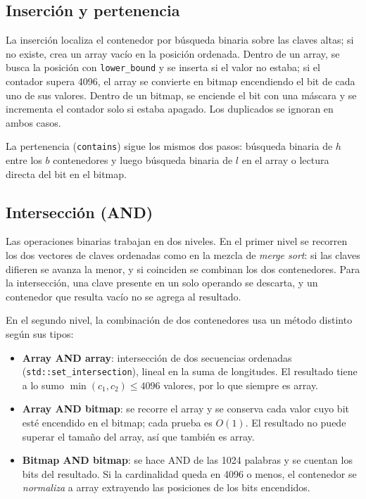 \documentclass[11pt,a4paper]{article}
\begin{document}
\subsection{Inserción y pertenencia}
La inserción localiza el contenedor por búsqueda binaria sobre las claves altas; si no existe, crea un array vacío en la posición ordenada. Dentro de un array, se busca la posición con \texttt{lower\_bound} y se inserta si el valor no estaba; si el contador supera 4096, el array se convierte en bitmap encendiendo el bit de cada uno de sus valores. Dentro de un bitmap, se enciende el bit con una máscara y se incrementa el contador solo si estaba apagado. Los duplicados se ignoran en ambos casos.

La pertenencia (\texttt{contains}) sigue los mismos dos pasos: búsqueda binaria de $h$ entre los $b$ contenedores y luego búsqueda binaria de $l$ en el array o lectura directa del bit en el bitmap.

\subsection{Intersección (AND)}
Las operaciones binarias trabajan en dos niveles. En el primer nivel se recorren los dos vectores de claves ordenadas como en la mezcla de \emph{merge sort}: si las claves difieren se avanza la menor, y si coinciden se combinan los dos contenedores. Para la intersección, una clave presente en un solo operando se descarta, y un contenedor que resulta vacío no se agrega al resultado.

En el segundo nivel, la combinación de dos contenedores usa un método distinto según sus tipos:
\begin{itemize}
\item \textbf{Array AND array}: intersección de dos secuencias ordenadas (\texttt{std::set\_intersection}), lineal en la suma de longitudes. El resultado tiene a lo sumo $\min(c_1,c_2)\le4096$ valores, por lo que siempre es array.
\item \textbf{Array AND bitmap}: se recorre el array y se conserva cada valor cuyo bit esté encendido en el bitmap; cada prueba es $O(1)$. El resultado no puede superar el tamaño del array, así que también es array.
\item \textbf{Bitmap AND bitmap}: se hace AND de las 1024 palabras y se cuentan los bits del resultado. Si la cardinalidad queda en 4096 o menos, el contenedor se \emph{normaliza} a array extrayendo las posiciones de los bits encendidos.
\end{itemize}
\end{document}
